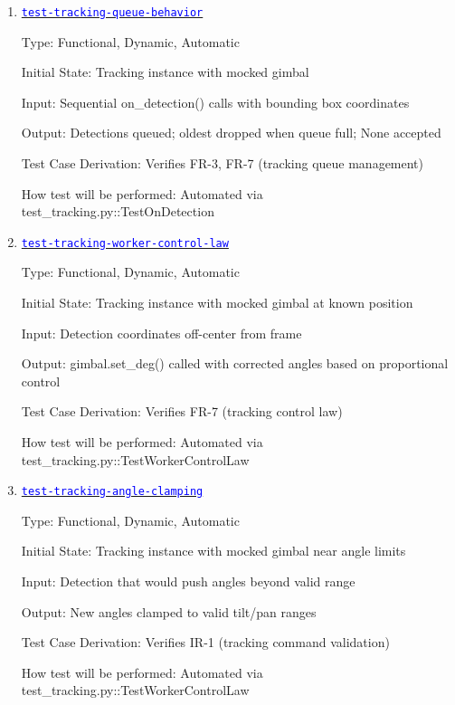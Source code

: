 \documentclass[12pt, titlepage]{article}
\newcommand{\tid}[1]{\hyperlink{tid:#1}{\textcolor{blue}{\texttt{#1}}}}
\begin{document}
\begin{enumerate}

  \item{\tid{test-tracking-queue-behavior}\\}

        Type: Functional, Dynamic, Automatic

        Initial State: Tracking instance with mocked gimbal

        Input: Sequential on\_detection() calls with bounding box coordinates

        Output: Detections queued; oldest dropped when queue full; None accepted

        Test Case Derivation: Verifies FR-3, FR-7 (tracking queue management)

        How test will be performed: Automated via test\_tracking.py::TestOnDetection

  \item{\tid{test-tracking-worker-control-law}\\}

        Type: Functional, Dynamic, Automatic

        Initial State: Tracking instance with mocked gimbal at known position

        Input: Detection coordinates off-center from frame

        Output: gimbal.set\_deg() called with corrected angles based on proportional
        control

        Test Case Derivation: Verifies FR-7 (tracking control law)

        How test will be performed: Automated via
        test\_tracking.py::TestWorkerControlLaw

  \item{\tid{test-tracking-angle-clamping}\\}

        Type: Functional, Dynamic, Automatic

        Initial State: Tracking instance with mocked gimbal near angle limits

        Input: Detection that would push angles beyond valid range

        Output: New angles clamped to valid tilt/pan ranges

        Test Case Derivation: Verifies IR-1 (tracking command validation)

        How test will be performed: Automated via
        test\_tracking.py::TestWorkerControlLaw


\end{enumerate}
\end{document}
